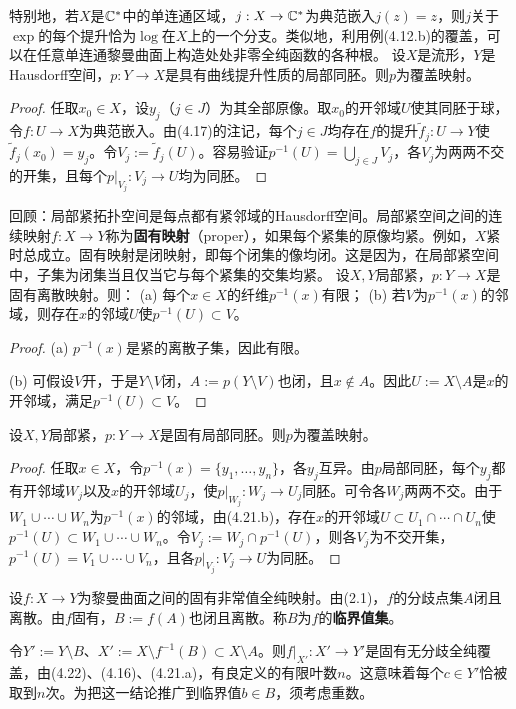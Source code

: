 特别地，若$X$是$\mathbb C^*$中的单连通区域，$j:X\to\mathbb C^*$为典范嵌入$j(z)=z$，则$j$关于$\exp$的每个提升恰为$\log$在$X$上的一个分支。类似地，利用例(4.12.b)的覆盖，可以在任意单连通黎曼曲面上构造处处非零全纯函数的各种根。
设$X$是流形，$Y$是Hausdorff空间，$p:Y\to X$是具有曲线提升性质的局部同胚。则$p$为覆盖映射。
\begin{proof}
任取$x_0\in X$，设$y_j$（$j\in J$）为其全部原像。取$x_0$的开邻域$U$使其同胚于球，令$f:U\to X$为典范嵌入。由(4.17)的注记，每个$j\in J$均存在$f$的提升$\widetilde f_j:U\to Y$使$\widetilde f_j(x_0)=y_j$。令$V_j:=\widetilde f_j(U)$。容易验证$p^{-1}(U)=\bigcup_{j\in J}V_j$，各$V_j$为两两不交的开集，且每个$p|_{V_j}:V_j\to U$均为同胚。
\end{proof}
回顾：局部紧拓扑空间是每点都有紧邻域的Hausdorff空间。局部紧空间之间的连续映射$f:X\to Y$称为\textbf{固有映射}（proper），如果每个紧集的原像均紧。例如，$X$紧时总成立。固有映射是闭映射，即每个闭集的像均闭。这是因为，在局部紧空间中，子集为闭集当且仅当它与每个紧集的交集均紧。
设$X,Y$局部紧，$p:Y\to X$是固有离散映射。则：
(a) 每个$x\in X$的纤维$p^{-1}(x)$有限；
(b) 若$V$为$p^{-1}(x)$的邻域，则存在$x$的邻域$U$使$p^{-1}(U)\subset V$。
\begin{proof}
(a) $p^{-1}(x)$是紧的离散子集，因此有限。

(b) 可假设$V$开，于是$Y\setminus V$闭，$A:=p(Y\setminus V)$也闭，且$x\notin A$。因此$U:=X\setminus A$是$x$的开邻域，满足$p^{-1}(U)\subset V$。
\end{proof}
设$X,Y$局部紧，$p:Y\to X$是固有局部同胚。则$p$为覆盖映射。
\begin{proof}
任取$x\in X$，令$p^{-1}(x)=\{y_1,\ldots,y_n\}$，各$y_j$互异。由$p$局部同胚，每个$y_j$都有开邻域$W_j$以及$x$的开邻域$U_j$，使$p|_{W_j}:W_j\to U_j$同胚。可令各$W_j$两两不交。由于$W_1\cup\cdots\cup W_n$为$p^{-1}(x)$的邻域，由(4.21.b)，存在$x$的开邻域$U\subset U_1\cap\cdots\cap U_n$使$p^{-1}(U)\subset W_1\cup\cdots\cup W_n$。令$V_j:=W_j\cap p^{-1}(U)$，则各$V_j$为不交开集，$p^{-1}(U)=V_1\cup\cdots\cup V_n$，且各$p|_{V_j}:V_j\to U$为同胚。
\end{proof}
设$f:X\to Y$为黎曼曲面之间的固有非常值全纯映射。由(2.1)，$f$的分歧点集$A$闭且离散。由$f$固有，$B:=f(A)$也闭且离散。称$B$为$f$的\textbf{临界值集}。

令$Y':=Y\setminus B$、$X':=X\setminus f^{-1}(B)\subset X\setminus A$。则$f|_{X'}:X'\to Y'$是固有无分歧全纯覆盖，由(4.22)、(4.16)、(4.21.a)，有良定义的有限叶数$n$。这意味着每个$c\in Y'$恰被取到$n$次。为把这一结论推广到临界值$b\in B$，须考虑重数。

